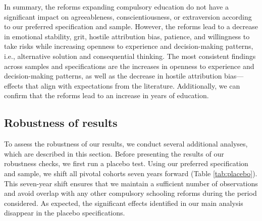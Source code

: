 In summary, the reforms expanding compulsory education do not have a significant impact on agreeableness, conscientiousness, or extraversion according to our preferred specification and sample. However, the reforms lead to a decrease in emotional stability, grit, hostile attribution bias, patience, and willingness to take risks while increasing openness to experience and decision-making patterns, i.e., alternative solution and consequential thinking. The most consistent findings across samples and specifications are the increases in openness to experience and decision-making patterns, as well as the decrease in hostile attribution bias---effects that align with expectations from the literature. Additionally, we can confirm that the reforms lead to an increase in years of education.

\subsection{Robustness of results}
To assess the robustness of our results, we conduct several additional analyses, which are described in this section. Before presenting the results of our robustness checks, we first run a placebo test. Using our preferred specification and sample, we shift all pivotal cohorts seven years forward (Table \ref{tab:placebo}). This seven-year shift ensures that we maintain a sufficient number of observations and avoid overlap with any other compulsory schooling reforms during the period considered. As expected, the significant effects identified in our main analysis disappear in the placebo specifications.

